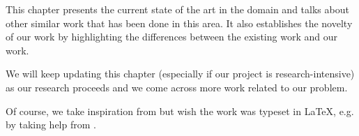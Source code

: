 This chapter presents the current state of the art in the domain and talks about other similar work that has been done in this area. It also establishes the novelty of our work by highlighting the differences between the existing work and our work.

We will keep updating this chapter (especially if our project is research-intensive) as our research proceeds and we come across more work related to our problem.

Of course, we take inspiration from \cite{einstein} but wish the work was typeset in \LaTeX \cite{knuthwebsite}, e.g. by taking help from \cite{latexcompanion}.